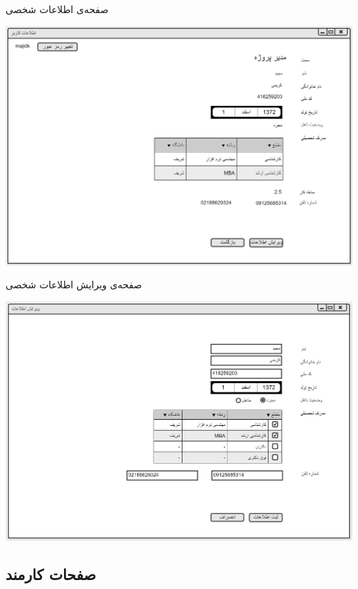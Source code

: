 \documentclass{article}
\begin{document}
\newpage
\vspace{1cm}
صفحه‌ی اطلاعات شخصی 
\begin{center}
\includegraphics[width=\textwidth]{Prototype/Accounting/PersonalInformation.png}
\end{center}

\vspace{1cm}
صفحه‌ی ویرایش اطلاعات شخصی 
\begin{center}
\includegraphics[width=\textwidth]{Prototype/Accounting/EditPersonalInformation.png}
\end{center}

\newpage
\subsection{صفحات کارمند}
\end{document}
